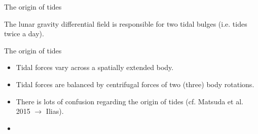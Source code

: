 \begin{frame}
  \begin{PointSix}{The origin of tides}
  \small The lunar gravity differential field is responsible for two tidal bulges (i.e. tides twice a day).
\end{PointSix}
\end{frame}

\begin{frame}
  \begin{PointSix}{The origin of tides}
      \small
      \begin{itemize}
        \item Tidal forces vary across a spatially extended body.
        \item Tidal forces are balanced by centrifugal forces of two (three) body rotations.
        \item There is lots of confusion regarding the origin of tides (cf. Matsuda et al. 2015 $\rightarrow$ Ilias).
        \item \color{MyBlue}{Tide models or reference measurements can be used for correction} 
      \end{itemize}
  \end{PointSix}
\end{frame}

